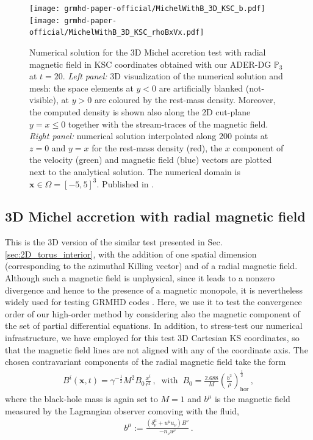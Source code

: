 \begin{figure}
	\begin{center} 
		\texttt{[image: grmhd-paper-official/MichelWithB\_3D\_KSC\_b.pdf]}
		\texttt{[image: grmhd-paper-official/MichelWithB\_3D\_KSC\_rhoBxVx.pdf]}
		\caption[
		Michel accretion, 3D 
		]
		{  Numerical solution for the 3D Michel
			accretion test with radial magnetic field in KSC coordinates
			obtained with our ADER-DG $\mathbb{P}_3$ at $t=20$. \textit{Left
				panel:} 3D visualization of the numerical solution and mesh: the
			space elements at $y<0$ are artificially blanked (not-visible), at
			$y>0$ are coloured by the rest-mass density. Moreover, the computed
			density is shown also along the 2D cut-plane $y=x\leq0$ together
			with the stream-traces of the magnetic field. \textit{Right panel:} numerical
			solution interpolated along $200$ points at $z=0$ and $y=x$ for the
			rest-mass density (red), the $x$ component of the velocity (green) and
			magnetic field (blue) vectors are plotted next to the analytical
			solution. The numerical domain is $\bm{x} \in \Omega = [-5,
			5]^3$. 
     		Published in \cite{Fambri2018}.
	}\label{fig:Michel3D}
	\end{center}
\end{figure}

\subsection{3D Michel accretion with radial magnetic field}
\label{sec:3D_Michel}
This is the 3D version of the similar test presented in
Sec. \ref{sec:2D_torus_interior}, with the addition of one spatial
dimension (corresponding to the azimuthal Killing vector) and of a
{radial magnetic field}. Although such a magnetic field is unphysical,
since it leads to a nonzero divergence and hence to the presence of a
{magnetic monopole}, it is nevertheless widely used for testing GRMHD
codes \cite{Etienne:2010ui}. Here, we use it to test the
convergence order of our high-order method by considering also the
magnetic component of the set of partial differential equations. In
addition, to stress-test our numerical infrastructure, we have employed
for this test 3D Cartesian KS coordinates, so that the magnetic field
lines are not aligned with any of the coordinate axis.
The chosen contravariant components of the radial magnetic field
take the form
%
\begin{align}
  B^i(\boldsymbol{x},t) = \gamma^{-\frac{1}{2}} M^2 B_0 \frac{x^i}{r^2}\,,
  ~\text{ with }~
  B_0 =
  \frac{2.688}{M}\left(\frac{b^2}{\rho}\right)_{\text{hor}}^{\frac{1}{2}}\,,
\end{align}
%
where the black-hole mass is again set to $M=1$ and $b^\mu$ is the
magnetic field measured by the Lagrangian observer comoving with the
fluid, \ie
\begin{align}
b^\mu := \frac{ \left(\delta^\mu_\nu + u^\mu u_\nu\right) B^\nu}{ -n_\nu
  u^\nu}\,.
\end{align}

